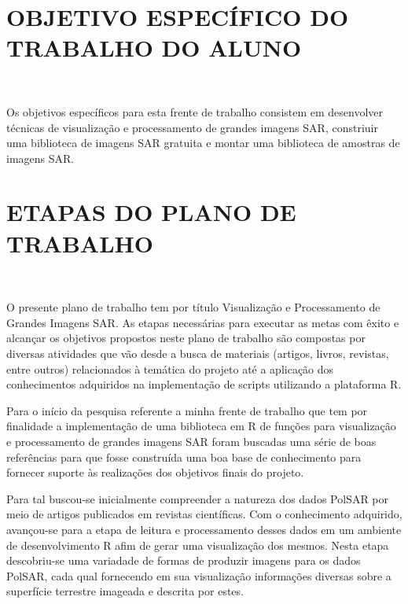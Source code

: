 \documentclass[12pt,letterpaper]{article}
\begin{document}
\newpage
\section*{\centering \textbf{OBJETIVO ESPECÍFICO DO TRABALHO DO ALUNO}}
\hrulefill \\

\vspace{0.5cm}

Os objetivos específicos para esta frente de trabalho consistem em desenvolver técnicas de visualização e processamento de grandes imagens SAR, constriuir uma biblioteca de imagens SAR gratuita e montar uma biblioteca de amostras de imagens SAR.



\newpage
\section*{\centering \textbf{ETAPAS DO PLANO DE TRABALHO}}
\hrulefill \\

\vspace{0.5cm}

O presente plano de trabalho tem por título Visualização e Processamento de Grandes Imagens SAR. As etapas necessárias para executar as metas com êxito e alcançar os objetivos propostos neste plano de trabalho são compostas por diversas atividades que vão desde a busca de materiais (artigos, livros, revistas, entre outros) relacionados à temática do projeto até a aplicação dos conhecimentos adquiridos na implementação de scripts utilizando a plataforma R. 

Para o início da pesquisa referente a minha frente de trabalho que tem por finalidade a implementação de uma biblioteca em R de funções para visualização e processamento de grandes imagens SAR foram buscadas uma série de boas referências para que fosse construída uma boa base de conhecimento para fornecer suporte às realizações dos objetivos finais do projeto.

Para tal buscou-se inicialmente compreender a natureza dos dados PolSAR por meio de artigos publicados em revistas científicas. Com o conhecimento adquirido, avançou-se para a etapa de leitura e processamento desses dados em um ambiente de desenvolvimento R afim de gerar uma visualização dos mesmos. Nesta etapa descobriu-se uma variadade de formas de produzir imagens para os dados PolSAR, cada qual fornecendo em sua visualização informações diversas sobre a superfície terrestre imageada e descrita por estes.
\end{document}
